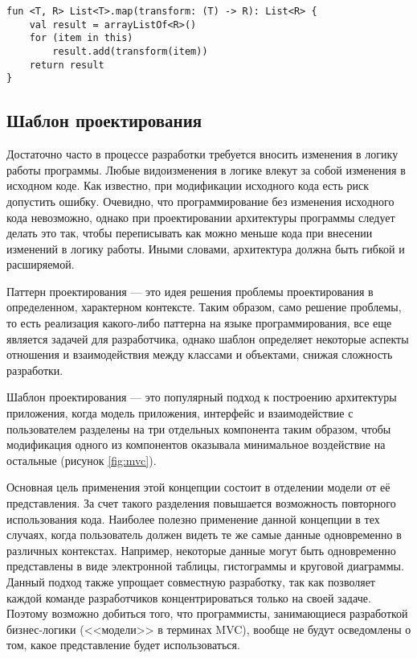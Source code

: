 \begin{lstlisting}[style = ktstyle, 
           caption = {Реализация популярной функции высшего порядка <<map>> на языке \kt{}},
           label = {lst:kt_map}]
fun <T, R> List<T>.map(transform: (T) -> R): List<R> {
    val result = arrayListOf<R>()
    for (item in this)
        result.add(transform(item))
    return result
}
\end{lstlisting}

\subsection{Шаблон проектирования \mvc{}}

Достаточно часто в процессе разработки требуется вносить изменения в логику
работы программы. Любые видоизменения в логике влекут за собой изменения в
исходном коде. Как известно, при модификации исходного кода есть риск допустить
ошибку. Очевидно, что программирование без изменения исходного кода невозможно,
однако при проектировании архитектуры программы следует делать это так, чтобы
переписывать как можно меньше кода при внесении изменений в логику работы. Иными
словами, архитектура должна быть гибкой и расширяемой.

Паттерн проектирования --- это идея решения проблемы проектирования в
определенном, характерном контексте. Таким образом, само решение проблемы, то
есть реализация какого-либо паттерна на языке программирования, все еще является
задачей для разработчика, однако шаблон определяет некоторые аспекты отношения и
взаимодействия между классами и объектами, снижая сложность разработки.

Шаблон проектирования \mvc{} --- это популярный подход к построению архитектуры
приложения, когда модель приложения, интерфейс и взаимодействие с пользователем
разделены на три отдельных компонента таким образом, чтобы модификация одного из
компонентов оказывала минимальное воздействие на остальные (рисунок
\ref{fig:mvc}).

Основная цель применения этой концепции состоит в отделении модели от её
представления. За счет такого разделения повышается возможность повторного
использования кода. Наиболее полезно применение данной концепции в тех случаях,
когда пользователь должен видеть те же самые данные одновременно в различных
контекстах. Например, некоторые данные могут быть одновременно представлены в
виде электронной таблицы, гистограммы и круговой диаграммы.
Данный подход также упрощает совместную разработку, так как позволяет каждой
команде разработчиков концентрироваться только на своей задаче.
Поэтому возможно добиться того, что программисты, занимающиеся разработкой
бизнес-логики (<<модели>> в терминах MVC), вообще не будут осведомлены о том,
какое представление будет использоваться.

